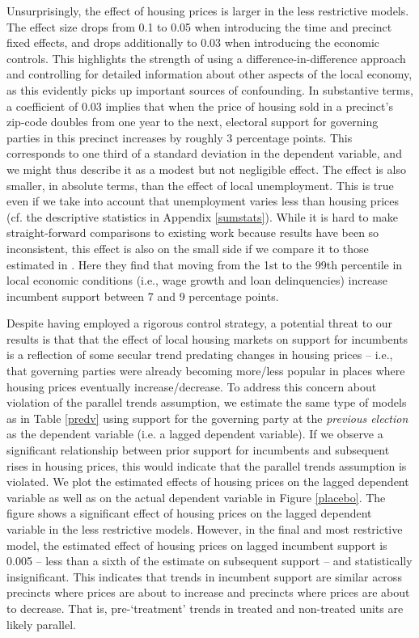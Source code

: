 \documentclass[12pt,a4paper]{article}
\begin{document}
	Unsurprisingly, the effect of housing prices is larger in the less restrictive models. The effect size drops from 0.1 to 0.05 when introducing the time and precinct fixed effects, and drops additionally to 0.03 when introducing the economic controls. This highlights the strength of using a difference-in-difference approach and controlling for detailed information about other aspects of the local economy, as this evidently picks up important sources of confounding. In substantive terms, a coefficient of 0.03 implies that when the price of housing sold in a precinct's zip-code doubles from one year to the next, electoral support for governing parties in this precinct increases by roughly 3 percentage points. This corresponds to one third of a standard deviation in the dependent variable, and we might thus describe it as a modest but not negligible effect. The effect is also smaller, in absolute terms, than the effect of local unemployment. This is true even if we take into account that unemployment varies less than housing prices (cf. the descriptive statistics in Appendix \ref{sumstats}).  While it is hard to make straight-forward comparisons to existing work because results have been so inconsistent, this effect is also on the small side if we compare it to those estimated in \cite{healy2017presidential}. Here they find that moving from the 1st to the 99th percentile in local economic conditions (i.e., wage growth and loan delinquencies) increase incumbent support between 7 and 9 percentage points.

	Despite having employed a rigorous control strategy, a potential threat to our results is that that the effect of local housing markets on support for incumbents is a reflection of some secular trend predating changes in housing prices -- i.e., that governing parties were already becoming more/less popular in places where housing prices eventually increase/decrease. To address this concern about violation of the parallel trends assumption, we estimate the same type of models as in Table \ref{predv} using support for the governing party at the \textit{previous election} as the dependent variable (i.e. a lagged dependent variable). If we observe a significant relationship between prior support for incumbents and subsequent rises in housing prices, this would indicate that the parallel trends assumption is violated. We plot the estimated effects of housing prices on the lagged dependent variable as well as on the actual dependent variable in Figure \ref{placebo}. The figure shows a significant effect of housing prices on the lagged dependent variable in the less restrictive models. However, in the final and most restrictive model, the estimated effect of housing prices on lagged incumbent support is 0.005 -- less than a sixth of the estimate on subsequent support -- and statistically insignificant. This indicates that trends in incumbent support are similar across precincts where prices are about to increase and precincts where prices  are about to decrease. That is, pre-‘treatment’ trends in treated and non-treated units are likely parallel.
	
\end{document}
